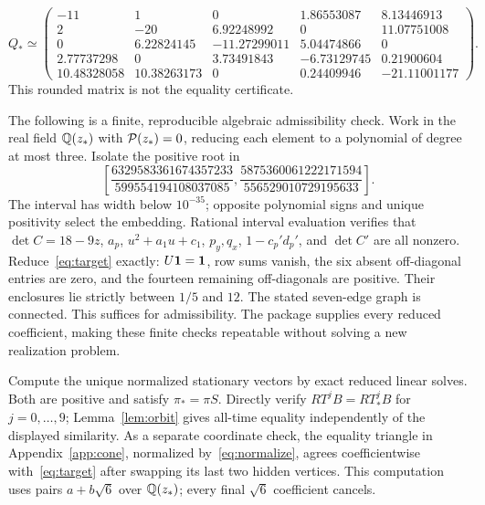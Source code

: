 \begin{equation}
 Q_*\simeq\begin{pmatrix}
 -11&1&0&1.86553087&8.13446913\\
 2&-20&6.92248992&0&11.07751008\\
 0&6.22824145&-11.27299011&5.04474866&0\\
 2.77737298&0&3.73491843&-6.73129745&0.21900604\\
 10.48328058&10.38263173&0&0.24409946&-21.11001177
 \end{pmatrix}.
\end{equation}
This rounded matrix is not the equality certificate.

The following is a finite, reproducible algebraic admissibility check. Work in the real field $\mathbb Q(z_*)$ with $\mathcal P(z_*)=0$, reducing each element to a polynomial of degree at most three. Isolate the positive root in
\begin{equation}
 \left[\frac{6329583361674357233}{599554194108037085},
 \frac{5875360061222171594}{556529010729195633}\right].\label{eq:rootinterval}
\end{equation}
The interval has width below $10^{-35}$; opposite polynomial signs and unique positivity select the embedding. Rational interval evaluation verifies that $\det C=18-9z$, $a_p$, $u^2+a_1u+c_1$, $p_y,q_x$, $1-c_p'd_p'$, and $\det C'$ are all nonzero. Reduce~\eqref{eq:target} exactly: $U\mathbf 1=\mathbf 1$, row sums vanish, the six absent off-diagonal entries are zero, and the fourteen remaining off-diagonals are positive. Their enclosures lie strictly between $1/5$ and $12$. The stated seven-edge graph is connected. This suffices for admissibility. The package supplies every reduced coefficient, making these finite checks repeatable without solving a new realization problem.

Compute the unique normalized stationary vectors by exact reduced linear solves. Both are positive and satisfy $\pi_* =\pi S$. Directly verify $RT^jB=RT_*^jB$ for $j=0,\ldots,9$; Lemma~\ref{lem:orbit} gives all-time equality independently of the displayed similarity. As a separate coordinate check, the equality triangle in Appendix~\ref{app:cone}, normalized by~\eqref{eq:normalize}, agrees coefficientwise with~\eqref{eq:target} after swapping its last two hidden vertices. This computation uses pairs $a+b\sqrt6$ over $\mathbb Q(z_*)$; every final $\sqrt6$ coefficient cancels.

